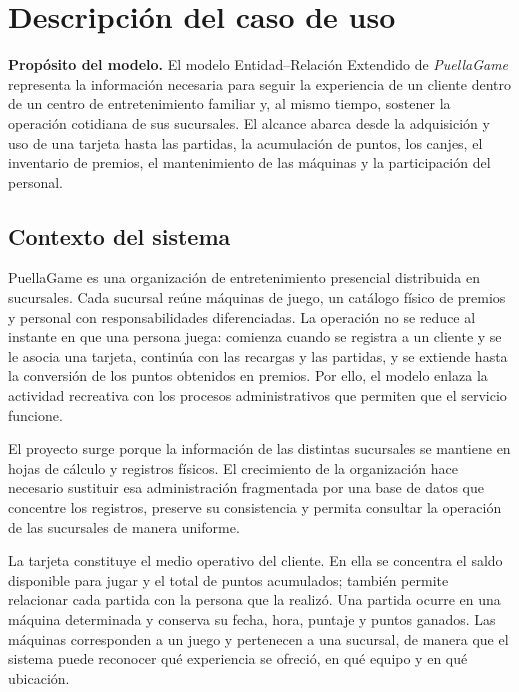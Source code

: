 \section{Descripción del caso de uso}

\begin{resumencaso}
\textbf{Propósito del modelo.} El modelo Entidad--Relación Extendido de
\textit{PuellaGame} representa la información necesaria para seguir la
experiencia de un cliente dentro de un centro de entretenimiento familiar y,
al mismo tiempo, sostener la operación cotidiana de sus sucursales. El alcance
abarca desde la adquisición y uso de una tarjeta hasta las partidas, la
acumulación de puntos, los canjes, el inventario de premios, el mantenimiento
de las máquinas y la participación del personal.
\end{resumencaso}

\subsection{Contexto del sistema}

PuellaGame es una organización de entretenimiento presencial distribuida en
sucursales. Cada sucursal reúne máquinas de juego, un catálogo físico de
premios y personal con responsabilidades diferenciadas. La operación no se
reduce al instante en que una persona juega: comienza cuando se registra a un
cliente y se le asocia una tarjeta, continúa con las recargas y las partidas,
y se extiende hasta la conversión de los puntos obtenidos en premios. Por ello,
el modelo enlaza la actividad recreativa con los procesos administrativos que
permiten que el servicio funcione.

El proyecto surge porque la información de las distintas sucursales se mantiene
en hojas de cálculo y registros físicos. El crecimiento de la organización hace
necesario sustituir esa administración fragmentada por una base de datos que
concentre los registros, preserve su consistencia y permita consultar la
operación de las sucursales de manera uniforme.

La tarjeta constituye el medio operativo del cliente. En ella se concentra el
saldo disponible para jugar y el total de puntos acumulados; también permite
relacionar cada partida con la persona que la realizó. Una partida ocurre en
una máquina determinada y conserva su fecha, hora, puntaje y puntos ganados.
Las máquinas corresponden a un juego y pertenecen a una sucursal, de manera
que el sistema puede reconocer qué experiencia se ofreció, en qué equipo y en
qué ubicación.

